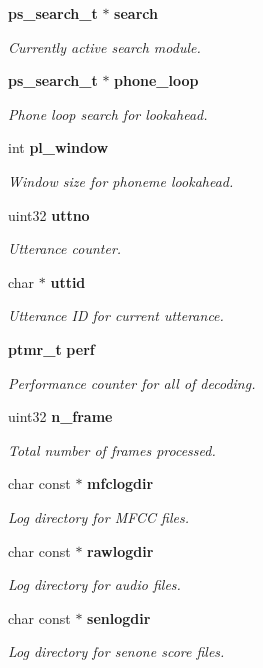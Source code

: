 \begin{DoxyCompactItemize}
{\bf ps\-\_\-search\-\_\-t} $\ast$ {\bf search}
\begin{DoxyCompactList}\small\item\em Currently active search module. \end{DoxyCompactList}\item 
{\bf ps\-\_\-search\-\_\-t} $\ast$ {\bf phone\-\_\-loop}
\begin{DoxyCompactList}\small\item\em Phone loop search for lookahead. \end{DoxyCompactList}\item 
int {\bf pl\-\_\-window}
\begin{DoxyCompactList}\small\item\em Window size for phoneme lookahead. \end{DoxyCompactList}\item 
uint32 {\bf uttno}
\begin{DoxyCompactList}\small\item\em Utterance counter. \end{DoxyCompactList}\item 
char $\ast$ {\bf uttid}
\begin{DoxyCompactList}\small\item\em Utterance I\-D for current utterance. \end{DoxyCompactList}\item 
{\bf ptmr\-\_\-t} {\bf perf}
\begin{DoxyCompactList}\small\item\em Performance counter for all of decoding. \end{DoxyCompactList}\item 
uint32 {\bf n\-\_\-frame}
\begin{DoxyCompactList}\small\item\em Total number of frames processed. \end{DoxyCompactList}\item 
char const $\ast$ {\bf mfclogdir}
\begin{DoxyCompactList}\small\item\em Log directory for M\-F\-C\-C files. \end{DoxyCompactList}\item 
char const $\ast$ {\bf rawlogdir}
\begin{DoxyCompactList}\small\item\em Log directory for audio files. \end{DoxyCompactList}\item 
char const $\ast$ {\bf senlogdir}
\begin{DoxyCompactList}\small\item\em Log directory for senone score files. \end{DoxyCompactList}\end{DoxyCompactItemize}


